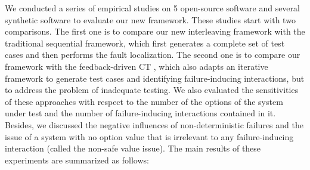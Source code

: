 \documentclass[journal,12pt,onecolumn,draftclsnofoot,]{IEEEtran}
\begin{document}

%
%
%

We conducted a series of empirical studies on 5 open-source software {\color{red} and several synthetic software} to evaluate our new framework. These studies start with two comparisons. The first one is to compare our new interleaving framework with the traditional sequential framework, which first generates a complete set of test cases and then performs the fault localization. The second one is to compare our framework with the feedback-driven CT \cite{dumlu2011feedback,yilmaz2013reducing}, which also adapts an iterative framework to generate test cases and identifying failure-inducing interactions, but to address the problem of inadequate testing. {\color{red}We also evaluated the sensitivities of these approaches with respect to the number of the options of the system under test and the number of failure-inducing interactions contained in it. Besides, we discussed the negative influences of non-deterministic failures and the issue of a system with no option value that is irrelevant to any failure-inducing interaction (called the non-safe value issue). The main results of these experiments are summarized as follows:}

\end{document}
